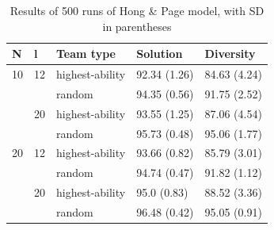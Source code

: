 \begin{table}[htbp]
    \centering
    \begin{tabular}{lllll}
      \toprule
      N & l & Team type &        Solution       & Diversity\\
      \midrule
      10 & 12 & highest-ability &  92.34 (1.26) &  84.63 (4.24) \\
         &    & random &  94.35 (0.56) &  91.75 (2.52) \\
         & 20 & highest-ability &  93.55 (1.25) &  87.06 (4.54) \\
         &    & random &  95.73 (0.48) &  95.06 (1.77) \\
      \midrule
      20 & 12 & highest-ability &  93.66 (0.82) &  85.79 (3.01) \\
         &    & random &  94.74 (0.47) &  91.82 (1.12) \\
         & 20 & highest-ability &   95.0 (0.83) &  88.52 (3.36) \\
         &    & random &  96.48 (0.42) &  95.05 (0.91) \\
      \bottomrule
      \end{tabular}
    \caption{\label{tab:HP}Results of 500 runs of Hong \& Page model, with SD in parentheses}
    \end{table}

